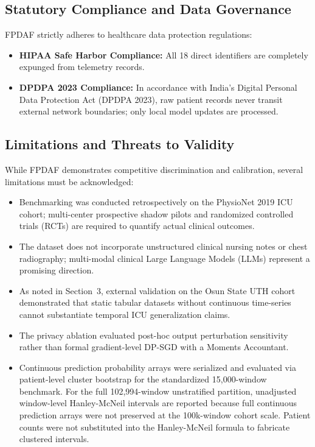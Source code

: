 \documentclass[final,5p,times,twocolumn]{elsarticle}
\begin{document}
\subsection{Statutory Compliance and Data Governance}
FPDAF strictly adheres to healthcare data protection regulations:
\begin{itemize}
    \item \textbf{HIPAA Safe Harbor Compliance:} All 18 direct identifiers are completely expunged from telemetry records.
    \item \textbf{DPDPA 2023 Compliance:} In accordance with India's Digital Personal Data Protection Act (DPDPA 2023), raw patient records never transit external network boundaries; only local model updates are processed.
\end{itemize}

\subsection{Limitations and Threats to Validity}
While FPDAF demonstrates competitive discrimination and calibration, several limitations must be acknowledged:
\begin{itemize}
    \item Benchmarking was conducted retrospectively on the PhysioNet 2019 ICU cohort; multi-center prospective shadow pilots and randomized controlled trials (RCTs) are required to quantify actual clinical outcomes.
    \item The dataset does not incorporate unstructured clinical nursing notes or chest radiography; multi-modal clinical Large Language Models (LLMs) represent a promising direction.
    \item As noted in Section~3, external validation on the Osun State UTH cohort demonstrated that static tabular datasets without continuous time-series cannot substantiate temporal ICU generalization claims.
    \item The privacy ablation evaluated post-hoc output perturbation sensitivity rather than formal gradient-level DP-SGD with a Moments Accountant.
    \item Continuous prediction probability arrays were serialized and evaluated via patient-level cluster bootstrap for the standardized 15,000-window benchmark. For the full 102,994-window unstratified partition, unadjusted window-level Hanley-McNeil intervals are reported because full continuous prediction arrays were not preserved at the 100k-window cohort scale. Patient counts were not substituted into the Hanley-McNeil formula to fabricate clustered intervals.
\end{itemize}
\end{document}
